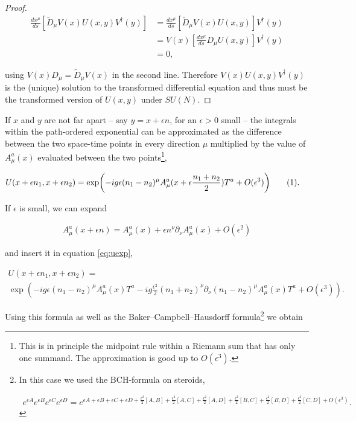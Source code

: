 \documentclass{article}
\newcommand\numberthis{\addtocounter{equation}{1}\tag{\theequation}}
\theoremstyle{plain} %
\theoremstyle{convention} %
\theoremstyle{remark} %
\numberwithin{equation}{section}
\begin{document}
\begin{proof}
\begin{align*}
    \frac{dx^{\mu}}{ds} \left[ \tilde{D}_{\mu} V(x) U(x,y) V^{\dagger}(y) \right] &= \frac{dx^{\mu}}{ds} \left[ \tilde{D}_{\mu} V(x) U(x,y) \right] V^{\dagger}(y) \\
    &= V(x) \left[ \frac{dx^{\mu}}{ds} D_{\mu} U(x,y) \right] V^{\dagger}(y) \\
    &= 0,
\end{align*}

using $V(x) D_{\mu} = \tilde{D}_{\mu} V(x)$ in the second line. Therefore $V(x) U(x,y) V^{\dagger}(y)$ is the (unique) solution to the transformed differential equation and thus must be the transformed version of $U(x,y)$ under $SU(N)$.

\end{proof}

If $x$ and $y$ are not far apart -- say $y=x+\epsilon n$, for an $\epsilon>0$ small -- the integrals within the path-ordered exponential can be approximated as the difference between the two space-time points in every direction $\mu$ multiplied by the value of $A_{\mu}^a(x)$ evaluated between the two points\footnote{This is in principle the midpoint rule within a Riemann sum that has only one summand. The approximation is good up to $O(\epsilon^3)$.},

\begin{align*}
    U(x + \epsilon n_1, x + \epsilon n_2) &= \exp(-ig \epsilon (n_1 - n_2)^{\mu} A_{\mu}^a(x + \epsilon \frac{n_1 + n_2}{2} ) T^a +  O(\epsilon^3) ) \numberthis \label{eq:uexp}.
\end{align*}

If $\epsilon$ is small, we can expand

\begin{align*}
    A_{\mu}^a(x + \epsilon n) = A_{\mu}^a(x) + \epsilon n^{\nu} \partial_{\nu} A_{\mu}^a(x) + O(\epsilon^2)
\end{align*}

and insert it in equation \eqref{eq:uexp},

\begin{multline*}
    U(x + \epsilon n_1, x + \epsilon n_2) = \\
    \exp(-ig \epsilon (n_1 - n_2)^{\mu} A_{\mu}^a(x) T^a - ig \frac{\epsilon^2}{2} (n_1+n_2)^{\nu} \partial_{\nu} (n_1 - n_2)^{\mu} A_{\mu}^a(x) T^a + O(\epsilon^3) ).
\end{multline*}

Using this formula as well as the Baker–Campbell–Hausdorff formula\footnote{In this case we used the BCH-formula on steroids,

\begin{align*}
  e^{\epsilon A} e^{\epsilon B} e^{\epsilon C} e^{\epsilon D} = e^{\epsilon A + \epsilon B + \epsilon C + \epsilon D + \frac{\epsilon^2}{2} [A,B] + \frac{\epsilon^2}{2} [A,C] + \frac{\epsilon^2}{2} [A,D] + \frac{\epsilon^2}{2} [B,C] + \frac{\epsilon^2}{2} [B,D] + \frac{\epsilon^2}{2} [C,D] + O(\epsilon^3) }.
\end{align*}

} we obtain
\end{document}
